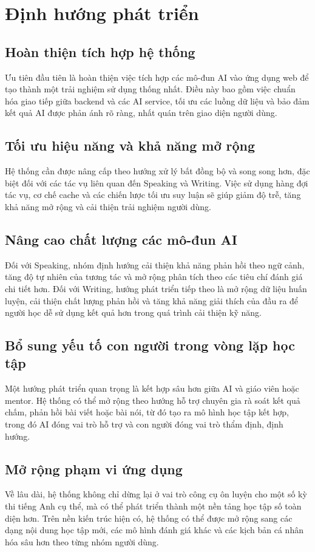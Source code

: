 \section{Định hướng phát triển}

\subsection{Hoàn thiện tích hợp hệ thống}
Ưu tiên đầu tiên là hoàn thiện việc tích hợp các mô-đun AI vào ứng dụng web để tạo thành một trải nghiệm sử dụng thống nhất. Điều này bao gồm việc chuẩn hóa giao tiếp giữa backend và các AI service, tối ưu các luồng dữ liệu và bảo đảm kết quả AI được phản ánh rõ ràng, nhất quán trên giao diện người dùng.

\subsection{Tối ưu hiệu năng và khả năng mở rộng}
Hệ thống cần được nâng cấp theo hướng xử lý bất đồng bộ và song song hơn, đặc biệt đối với các tác vụ liên quan đến Speaking và Writing. Việc sử dụng hàng đợi tác vụ, cơ chế cache và các chiến lược tối ưu suy luận sẽ giúp giảm độ trễ, tăng khả năng mở rộng và cải thiện trải nghiệm người dùng.

\subsection{Nâng cao chất lượng các mô-đun AI}
Đối với Speaking, nhóm định hướng cải thiện khả năng phản hồi theo ngữ cảnh, tăng độ tự nhiên của tương tác và mở rộng phân tích theo các tiêu chí đánh giá chi tiết hơn. Đối với Writing, hướng phát triển tiếp theo là mở rộng dữ liệu huấn luyện, cải thiện chất lượng phản hồi và tăng khả năng giải thích của đầu ra để người học dễ sử dụng kết quả hơn trong quá trình cải thiện kỹ năng.

\subsection{Bổ sung yếu tố con người trong vòng lặp học tập}
Một hướng phát triển quan trọng là kết hợp sâu hơn giữa AI và giáo viên hoặc mentor. Hệ thống có thể mở rộng theo hướng hỗ trợ chuyên gia rà soát kết quả chấm, phản hồi bài viết hoặc bài nói, từ đó tạo ra mô hình học tập kết hợp, trong đó AI đóng vai trò hỗ trợ và con người đóng vai trò thẩm định, định hướng.

\subsection{Mở rộng phạm vi ứng dụng}
Về lâu dài, hệ thống không chỉ dừng lại ở vai trò công cụ ôn luyện cho một số kỳ thi tiếng Anh cụ thể, mà có thể phát triển thành một nền tảng học tập số toàn diện hơn. Trên nền kiến trúc hiện có, hệ thống có thể được mở rộng sang các dạng nội dung học tập mới, các mô hình đánh giá khác và các kịch bản cá nhân hóa sâu hơn theo từng nhóm người dùng.


